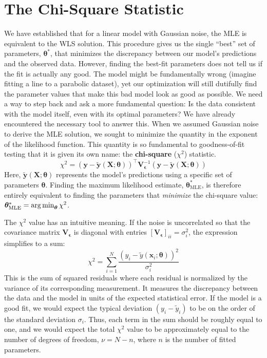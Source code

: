 \section{The Chi-Square Statistic}
We have established that for a linear model with Gaussian noise, the MLE is equivalent to the WLS solution. This procedure gives us the single ``best'' set of parameters, $\boldsymbol{\theta}^*$, that minimizes the discrepancy between our model's predictions and the observed data. However, finding the best-fit parameters does not tell us if the fit is actually any good. The model might be fundamentally wrong (imagine fitting a line to a parabolic dataset), yet our optimization will still dutifully find the parameter values that make this bad model look as good as possible. We need a way to step back and ask a more fundamental question: Is the data consistent with the model itself, even with its optimal parameters? We have already encountered the necessary tool to answer this. When we assumed Gaussian noise to derive the MLE solution, we sought to minimize the quantity in the exponent of the likelihood function. This quantity is so fundamental to goodness-of-fit testing that it is given its own name: the \textbf{chi-square} ($\chi^2$) statistic.
\begin{equation}
    \chi^2 = (\mathbf{y} - \tilde{\mathbf{y}}(\mathbf{X}; \boldsymbol{\theta}))^\top \mathbf{V}_{\boldsymbol{\epsilon}}^{-1} (\mathbf{y} - \tilde{\mathbf{y}}(\mathbf{X}; \boldsymbol{\theta}))
\end{equation}
Here, $\tilde{\mathbf{y}}(\mathbf{X}; \boldsymbol{\theta})$ represents the model's predictions using a specific set of parameters $\boldsymbol{\theta}$. Finding the maximum likelihood estimate, $\boldsymbol{\theta}_{\text{MLE}}^*$, is therefore entirely equivalent to finding the parameters that \textit{minimize} the chi-square value: $\boldsymbol{\theta}_{\text{MLE}}^* = \operatorname*{arg\,min}_{\boldsymbol{\theta}} \chi^2$.

The $\chi^2$ value has an intuitive meaning. If the noise is uncorrelated so that the covariance matrix $\mathbf{V}_{\boldsymbol{\epsilon}}$ is diagonal with entries $[\mathbf{V}_{\boldsymbol{\epsilon}}]_{ii} = \sigma_i^2$, the expression simplifies to a sum:
\begin{equation}
    \chi^2 = \sum_{i=1}^N \frac{(y_i - \tilde{y}(\mathbf{x}_i; \boldsymbol{\theta}))^2}{\sigma_i^2}
    \label{eq:chi-square-sum}
\end{equation}
This is the sum of squared residuals where each residual is normalized by the variance of its corresponding measurement. It measures the discrepancy between the data and the model in units of the expected statistical error. If the model is a good fit, we would expect the typical deviation $(y_i - \tilde{y}_i)$ to be on the order of the standard deviation $\sigma_i$. Thus, each term in the sum should be roughly equal to one, and we would expect the total $\chi^2$ value to be approximately equal to the number of degrees of freedom, $\nu = N - n$, where $n$ is the number of fitted parameters.

